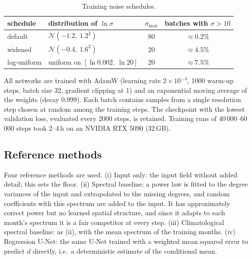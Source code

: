 \documentclass[11pt,a4paper]{article}
\begin{document}
\begin{table}[ht]
\centering\small
\caption{Training noise schedules.}
\label{tab:schedules}
\begin{tabular}{llcc}
  \toprule
  schedule & distribution of $\ln\sigma$ & $\sigma_\mathrm{max}$ & batches with $\sigma > 10$ \\
  \midrule
  default & $\mathcal N(-1.2,\ 1.2^2)$ & 80 & $\approx 0.2\%$ \\
  widened & $\mathcal N(-0.4,\ 1.6^2)$ & 20 & $\approx 4.5\%$ \\
  log-uniform & uniform on $[\ln 0.002,\ \ln 20]$ & 20 & $\approx 7.5\%$ \\
  \bottomrule
\end{tabular}
\end{table}

All networks are trained with AdamW (learning rate $2\times10^{-4}$, 1000 warm-up steps,
batch size 32, gradient clipping at 1) and an exponential moving average of the weights (decay
0.999). Each batch contains samples from a single resolution step chosen at random among the
training steps. The checkpoint with the lowest validation loss, evaluated every 2000 steps, is
retained. Training runs of 40\,000--60\,000 steps took 2--4\,h on an NVIDIA RTX 5090 (32\,GB).

\subsection{Reference methods}
Four reference methods are used.
(i) Input only: the input field without added detail; this sets the floor.
(ii) Spectral baseline: a power law is fitted to the degree variances of the input and
extrapolated to the missing degrees, and random coefficients with this spectrum are added to
the input. It has approximately correct power but no learned spatial structure, and since it
adapts to each month's spectrum it is a fair competitor at every step.
(iii) Climatological spectral baseline: as (ii), with the mean spectrum of the training months.
(iv) Regression U-Net: the same U-Net trained with a weighted mean squared error to predict $d$
directly, i.e.\ a deterministic estimate of the conditional mean.
\end{document}
